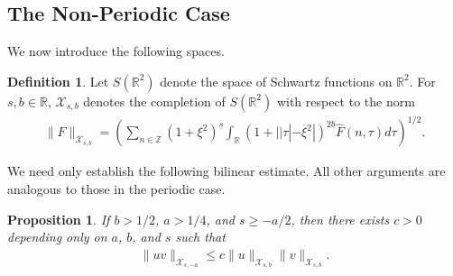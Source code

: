 \documentclass[12pt,reqno]{amsart}
\numberwithin{equation}{section}  %
\numberwithin{figure}{section}
\newcommand{\rr}{\mathbb{R}}
\newcommand{\zz}{\mathbb{Z}}
\newcommand{\wh}{\widehat}
\theoremstyle{plain}
\newtheorem{proposition}{Proposition}
\theoremstyle{definition}
\newtheorem{definition}{Definition}
\theoremstyle{remark}
\begin{document}
\subsection{The Non-Periodic Case} 
\label{ssec:non-periodic-case}
We now introduce the following spaces. 
%
%
\begin{definition}
  Let $S(\rr^{2})$ denote the space of Schwartz functions on
  $\rr^{2}$.  For $s, b \in \rr$, $\mathcal{X}_{s,b}$
  denotes the completion of $S(\rr^{2})$ with
  respect to the norm
  \begin{equation}
  \begin{split}
    \|F\|_{\mathcal{X}_{s,b}} = \left( \sum_{n \in \zz} (1 + \xi^{2})^{s} \int_{\rr}
    (1 + | | \tau | - \xi^{2} |)^{2b} \wh{F}(n, \tau) d \tau\right)^{1/2}.
  \end{split}
  \label{eqn:bous-norm-real}
  \end{equation}
\end{definition}
%
%
We need only establish the following bilinear estimate. All other arguments are
analogous to those in the periodic case.
%
\begin{proposition}
\label{prop:bilin-est-real}
If $b > 1/2$, $a > 1/4$, and $s \ge -a/2$, 
  then there exists $c > 0$ depending only on $a$, $b$, and $s$ such that
  \begin{equation*}
  \begin{split}
    \| uv \|_{\mathcal{X}_{s,-a}} \le c \| u \|_{\mathcal{X}_{s,b}} \| v \|_{\mathcal{X}_{s,b}}.
  \end{split}
  \end{equation*}
\end{proposition}
\end{document}
